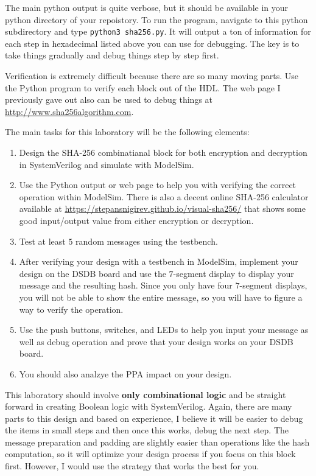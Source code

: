 \documentclass{article}
\begin{document}
The main python output is quite verbose, but it should be available in
your python directory of your repoistory.  To run the program,
navigate to this python subdirectory and type
\verb!python3 sha256.py!.  It will output a ton of information for
each step in hexadecimal listed above you can use for debugging.  The
key is to take things gradually and debug things step by step first.  

Verification is extremely difficult
because there are so many moving parts.  Use the
Python program to verify each block out of the HDL.  The web page I
previously gave out also can be used to debug things at
\url{http://www.sha256algorithm.com}.  

The main tasks for this laboratory
will be the following elements:
\begin{enumerate}
  \item Design the SHA-256 combinatianal block for both encryption and
    decryption in SystemVerilog and simulate with ModelSim.
  \item Use the Python output or web page to help you with verifying the
    correct operation within ModelSim.
    There is also a decent online
    SHA-256 calculator available at \url{https://stepansnigirev.github.io/visual-sha256/} that
    shows some good input/output value from either encryption or decryption.  
  \item Test at least $5$ random messages using the testbench.
  \item After verifying your design with a testbench in ModelSim,
    implement your design on the DSDB board and use the    
    $7$-segment display to display your message and the resulting hash.
    Since you only have four $7$-segment displays, you will not be
    able to show the entire message, so you will
    have to figure a way to verify the operation.
  \item Use the push buttons, switches, and LEDs to help you input
    your message as well as debug operation and prove that your
    design works on your DSDB board.
    \item You should also analzye the PPA impact on your design. 
\end{enumerate}
This laboratory should involve \textbf{only combinational logic} and be
straight forward in creating Boolean logic with SystemVerilog.
Again, there are many parts to this design and based on experience, I
believe it will be easier to debug the items in small steps and then
once this works, debug the next step.  The message preparation and
padding are slightly easier than operations like the hash computation,
so it will optimize your design process if you focus on this block
first.  However, I would use the strategy that works the best for you.
\end{document}
